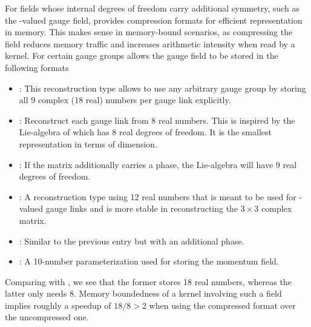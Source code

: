 For fields whose internal degrees of freedom carry additional symmetry, such as the -valued gauge field, \quda provides compression formats for efficient representation in memory.
This makes sense in memory-bound scenarios, as compressing the field reduces memory traffic and increases arithmetic intensity when read by a kernel.
For certain gauge groups \quda allows the gauge field to be stored in the following formats
\begin{itemize}
  \item {}: This reconstruction type allows to use any arbitrary gauge group by storing all \num{9} complex (\num{18} real) numbers per gauge link explicitly.
  \item {}: Reconstruct each gauge link from \num{8} real numbers. This is inspired by the Lie-algebra of  which has \num{8} real degrees of freedom. It is the smallest representation in terms of dimension.
  \item {}: If the  matrix additionally carries a  phase, the Lie-algebra will have \num{9} real degrees of freedom.
  \item {}: A reconstruction type using \num{12} real numbers that is meant to be used for -valued gauge links and is more stable in reconstructing the $3 \times 3$ complex matrix.
  \item {}: Similar to the previous entry but with an additional  phase.
  \item {}: A \num{10}-number parameterization used for storing the momentum field.
\end{itemize}
Comparing  with , we see that the former stores \num{18} real numbers, whereas the latter only needs \num{8}. Memory boundedness of a kernel involving such a field implies roughly a speedup of $18/8 > 2$ when using the compressed format over the uncompressed one.

